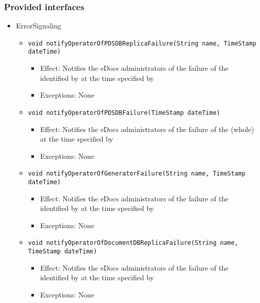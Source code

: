 \subsubsection*{Provided interfaces}
\begin{itemize}
    \item ErrorSignaling
    \begin{itemize}
        \item \texttt{void notifyOperatorOfPDSDBReplicaFailure(String name, TimeStamp dateTime)}
        \begin{itemize}
            \item Effect: Notifies the eDocs administrators of the failure of the  identified by  at the time specified by 
            \item Exceptions: None
        \end{itemize}

        \item \texttt{void notifyOperatorOfPDSDBFailure(TimeStamp dateTime)}
        \begin{itemize}
            \item Effect: Notifies the eDocs administrators of the failure of the (whole)  at the time specified by 
            \item Exceptions: None
        \end{itemize}

        \item \texttt{void notifyOperatorOfGeneratorFailure(String name, TimeStamp dateTime)}
        \begin{itemize}
            \item Effect: Notifies the eDocs administrators of the failure of the  identified by  at the time specified by 
            \item Exceptions: None
        \end{itemize}

		\item \texttt{void notifyOperatorOfDocumentDBReplicaFailure(String name, TimeStamp dateTime)}
        \begin{itemize}
            \item Effect: Notifies the eDocs administrators of the failure of the  identified by  at the time specified by 
            \item Exceptions: None
        \end{itemize}
    \end{itemize}


\end{itemize}
